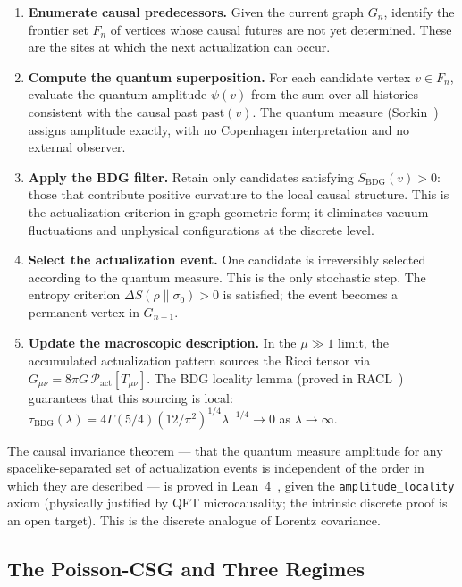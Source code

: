 \documentclass[11pt,a4paper]{article}
\newcommand{\SBDG}{S_{\mathrm{BDG}}}
\newcommand{\Pact}{\mathcal{P}_{\mathrm{act}}}
\begin{document}
\begin{enumerate}[noitemsep,label=\textbf{\arabic*.},leftmargin=*]
  \item \textbf{Enumerate causal predecessors.} Given the current graph
  $G_n$, identify the frontier set $F_n$ of vertices whose causal futures
  are not yet determined. These are the sites at which the next
  actualization can occur.
  \item \textbf{Compute the quantum superposition.} For each candidate
  vertex $v \in F_n$, evaluate the quantum amplitude $\psi(v)$ from the
  sum over all histories consistent with the causal past $\mathrm{past}(v)$.
  The quantum measure (Sorkin~\citep{Sorkin1994}) assigns amplitude exactly,
  with no Copenhagen interpretation and no external observer.
  \item \textbf{Apply the BDG filter.} Retain only candidates satisfying
  $\SBDG(v) > 0$: those that contribute positive curvature to the local
  causal structure. This is the actualization criterion in graph-geometric
  form; it eliminates vacuum fluctuations and unphysical configurations
  at the discrete level.
  \item \textbf{Select the actualization event.} One candidate is
  irreversibly selected according to the quantum measure. This is the
  only stochastic step. The entropy criterion $\Delta S(\rho\|\sigma_0)
  > 0$ is satisfied; the event becomes a permanent vertex in $G_{n+1}$.
  \item \textbf{Update the macroscopic description.} In the
  $\mu \gg 1$ limit, the accumulated actualization pattern sources the
  Ricci tensor via $G_{\mu\nu} = 8\pi G\,\Pact[T_{\mu\nu}]$.
  The BDG locality lemma (proved in RACL~\citep{Sandeman2026RACL})
  guarantees that this sourcing is local:
  $\tau_{\mathrm{BDG}}(\lambda) = 4\Gamma(5/4)(12/\pi^2)^{1/4}\lambda^{-1/4}
  \to 0$ as $\lambda \to \infty$.
\end{enumerate}

The causal invariance theorem --- that the quantum measure amplitude
for any spacelike-separated set of actualization events is independent
of the order in which they are described --- is proved in
Lean~4~\citep{Sandeman2026RAGC}, given the \texttt{amplitude\_locality}
axiom (physically justified by QFT microcausality; the intrinsic discrete
proof is an open target). This is the discrete analogue of Lorentz
covariance.

\subsection{The Poisson-CSG and Three Regimes}
\end{document}
